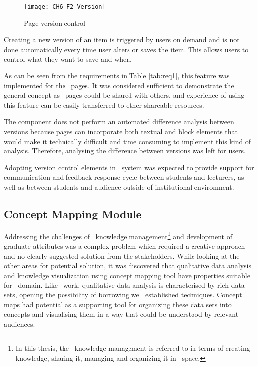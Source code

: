 \begin{figure}[htb]
\centering
\texttt{[image: CH6-F2-Version]}
\caption{Page version control}
\label{fig:version}
\end{figure}

Creating a new version of an item is triggered by users on demand and is not
done automatically every time user alters or saves the item. This allows users to
control what they want to save and when.

As can be seen from the requirements in Table \ref{tab:req1}, this feature was
implemented for the \ep~pages. It was considered sufficient to demonstrate the
general concept as \ep~pages could be shared with others, and experience of
using this feature can be easily transferred to other shareable resources.

The component does not perform an automated difference analysis between versions
because pages can incorporate both textual and block elements that would make it
technically difficult and time consuming to implement this kind of analysis.
Therefore, analysing the difference between versions was left for users.
 
Adopting version control elements in \ep~system was expected to provide support
for communication and feedback-response cycle between students and lecturers, as
well as between students and audience outside of institutional environment.

\subsection{Concept Mapping Module}
\label{sec:mapping}
Addressing the challenges of \ep~knowledge management\footnote{In this thesis,
the \ep~knowledge management is referred to in terms of creating knowledge,
sharing it, managing and organizing it in \ep~space.} and development of
graduate attributes was a complex problem which required a creative approach and
no clearly suggested solution from the stakeholders. While looking at the other
areas for potential solution, it was discovered that qualitative data analysis
and knowledge visualization using concept mapping tool have properties suitable
for \ep~domain. Like \ep~work, qualitative data analysis is characterised by
rich data sets, opening the possibility of borrowing well established
techniques. Concept maps had potential as a supporting tool for organizing these
data sets into concepts and visualising them in a way that could be understood
by relevant audiences.

